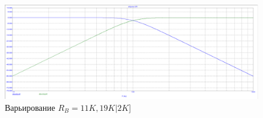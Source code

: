 \documentclass[15pt,a5paper,reqno]{article}
\begin{document}
\begin{figure}[h!]
    \centering
    \includegraphics[width=12cm]{pics/point4_3.png}
    \caption{Варьирование $R_B  = 11K, 19K | 2K]$}
    \label{}
\end{figure}
\end{document}

